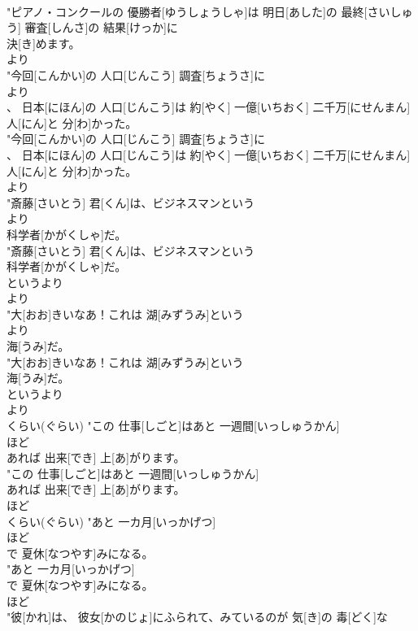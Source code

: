 \documentclass[8pt]{extreport}
\begin{document}
\begin{CJK}{UTF8}{min}
\\	"ピアノ・コンクールの 優勝者[ゆうしょうしゃ]は 明日[あした]の 最終[さいしゅう] 審査[しんさ]の 結果[けっか]に
\\	決[き]めます。
\\	より
\\	"今回[こんかい]の 人口[じんこう] 調査[ちょうさ]に
\\	より
\\	、 日本[にほん]の 人口[じんこう]は 約[やく] 一億[いちおく] 二千万[にせんまん] 人[にん]と 分[わ]かった。
\\	"今回[こんかい]の 人口[じんこう] 調査[ちょうさ]に
\\	、 日本[にほん]の 人口[じんこう]は 約[やく] 一億[いちおく] 二千万[にせんまん] 人[にん]と 分[わ]かった。
\\	より
\\	"斎藤[さいとう] 君[くん]は、ビジネスマンという
\\	より
\\	科学者[かがくしゃ]だ。
\\	"斎藤[さいとう] 君[くん]は、ビジネスマンという
\\	科学者[かがくしゃ]だ。
\\	というより 
\\	より
\\	"大[おお]きいなあ！これは 湖[みずうみ]という
\\	より
\\	海[うみ]だ。
\\	"大[おお]きいなあ！これは 湖[みずうみ]という
\\	海[うみ]だ。
\\	というより 
\\	より
\\	くらい(ぐらい)	"この 仕事[しごと]はあと 一週間[いっしゅうかん]
\\	ほど
\\	あれば 出来[でき] 上[あ]がります。
\\	"この 仕事[しごと]はあと 一週間[いっしゅうかん]
\\	あれば 出来[でき] 上[あ]がります。
\\	ほど
\\	くらい(ぐらい)	"あと 一カ月[いっかげつ]
\\	ほど
\\	で 夏休[なつやす]みになる。
\\	"あと 一カ月[いっかげつ]
\\	で 夏休[なつやす]みになる。
\\	ほど
\\	"彼[かれ]は、 彼女[かのじょ]にふられて、みているのが 気[き]の 毒[どく]な

\end{CJK}
\end{document}
